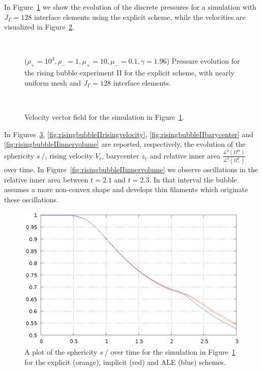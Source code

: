 \documentclass[a4paper,12pt,onecolumn]{article}
\newcommand{\strikes}{\mbox{$s\!\!\!\!\:/$}}
\begin{document}
In Figure~\ref{fig:risingbubbleIIpressure} we show the evolution of the discrete
pressures for a simulation with $J_\Gamma=128$ interface elements using the
explicit scheme, while the velocities are visualized in
Figure~\ref{fig:risingbubbleIIvelocity}.
\begin{figure}[htbp]
\centering
{}
\\
\caption[Navier--Stokes rising bubble II pressure]
{($\rho_+ = 10^3,\rho_- = 1,\mu_+ = 10,\mu_- =0.1,\gamma = 1.96$)
Pressure evolution for the rising bubble experiment II for the explicit scheme,
with nearly uniform mesh and $J_\Gamma=128$ interface elements.}
\label{fig:risingbubbleIIpressure}
\end{figure}

\begin{figure}[htbp]
\centering
{}
\\
\caption[Navier--Stokes rising bubble II velocity]
{Velocity vector field for the simulation in
Figure~\ref{fig:risingbubbleIIpressure}.}
\label{fig:risingbubbleIIvelocity}
\end{figure}

In Figures~\ref{fig:risingbubbleIIsphericity},
\ref{fig:risingbubbleIIrisingvelocity}, \ref{fig:risingbubbleIIbarycenter} and
\ref{fig:risingbubbleIIinnervolume} are reported, respectively, the evolution of
the sphericity $\strikes$, rising velocity $V_c$, barycenter $z_c$ and relative
inner area $\frac{\mathcal{L}^2(\Omega^m_-)}{\mathcal{L}^2(\Omega^0_-)}$ over
time. In Figure~\ref{fig:risingbubbleIIinnervolume} we observe oscillations in
the relative inner area between $t=2.1$ and $t=2.3$. In that interval the bubble
assumes a more non-convex shape and develops thin filaments which originate
these oscillations.
\begin{figure}[htbp]
\centering
\includegraphics[width=.45\textwidth]
{figures/rising_bubble_II_sphericity.ps}
\caption[Navier--Stokes rising bubble II sphericity]
{A plot of the sphericity $\strikes$ over time for the simulation in
Figure~\ref{fig:risingbubbleIIpressure} for the explicit (orange), implicit
(red) and ALE (blue) schemes.}
\label{fig:risingbubbleIIsphericity}
\end{figure}
\end{document}
